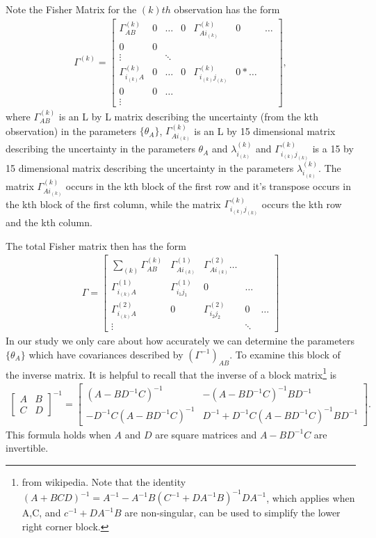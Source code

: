 \documentclass[aps,prd,amsmath,showpacs,amssymb,superscriptaddress,nofootinbib,longbibliography,eqsecnum,preprintnumbers]{revtex4-1}
\begin{document}
Note the Fisher Matrix for the $(k)th$ observation has the form
\begin{align}
\Gamma^{(k)}=
\begin{bmatrix}
\Gamma^{(k)}_{AB} &0 & \dots & 0& \Gamma^{(k)}_{Ai_{(k)}}& 0& \dots\\
0 & 0& \\
\vdots & & \ddots \\
\Gamma^{(k)}_{i_{(k)}A} & 0 &\dots & 0 & \Gamma^{(k)}_{i_{(k)}j_{(k)}} & 0 *\dots \\
0 & 0 & \dots \\
\vdots
\end{bmatrix},
\end{align}
where $\Gamma^{(k)}_{AB}$ is an L by L matrix describing the uncertainty (from the kth observation) in the parameters $\{\theta_A\}$, $\Gamma^{(k)}_{Ai_{(k)}}$ is an L by 15 dimensional matrix describing the uncertainty in the parameters $\theta_A$ and $\lambda^{(k)}_{i_{(k)}}$ and $\Gamma^{(k)}_{i_{(k)}j_{(k)}}$ is a 15 by 15 dimensional matrix describing the uncertainty in the parameters $\lambda^{(k)}_{i_{(k)}}$. The matrix $\Gamma^{(k)}_{Ai_{(k)}}$ occurs in the kth block of the first row and it's transpose occurs in the kth block of the first column, while the matrix $\Gamma^{(k)}_{i_{(k)}j_{(k)}}$ occurs the kth row and the kth column.  

The total Fisher matrix then has the form
\begin{align}
\Gamma=
\begin{bmatrix}
\sum_{(k)}\Gamma_{AB}^{(k)} & \Gamma^{(1)}_{Ai_{(k)}} & \Gamma^{(2)}_{Ai_{(k)}} \dots \\
\Gamma^{(1)}_{i_{(k)}A} & \Gamma^{(1)}_{i_1j_1} & 0 &\dots \\
\Gamma^{(2)}_{i_{(k)}A}& 0 &\Gamma^{(2)}_{i_2j_2} & 0 &\dots \\
\vdots & & &\ddots 
\end{bmatrix}
\end{align}
In our study we only care about how accurately we can determine the parameters $\{\theta_A\}$ which have covariances described
by $(\Gamma^{-1})_{AB}$. To examine this block of the inverse matrix. It is helpful to recall that the inverse of a block matrix\footnote{from wikipedia. Note that the identity $(A+BCD)^{-1}=A^{-1}-A^{-1}B(C^{-1}+DA^{-1}B)^{-1}DA^{-1}$, which applies when A,C, and $c^{-1}+DA^{-1}B$ are non-singular, can be used to simplify the lower right corner block.} is 
\begin{align}
\begin{bmatrix}
A & B \\
C & D
\end{bmatrix}^{-1}=
\begin{bmatrix}
(A-BD^{-1}C)^{-1} &-(A-BD^{-1}C)^{-1}BD^{-1} \\
-D^{-1}C(A-BD^{-1}C)^{-1} & D^{-1}+D^{-1}C(A-BD^{-1}C)^{-1}BD^{-1}
\end{bmatrix}.
\end{align}
This formula holds when $A$ and $D$ are square matrices and $A-BD^{-1}C$ are invertible.
\end{document}
